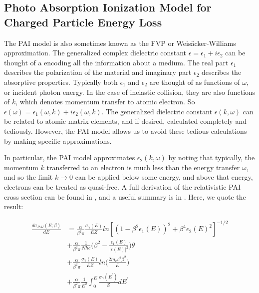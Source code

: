 \subsection{Photo Absorption Ionization Model for Charged Particle Energy Loss}
\label{sec:pai}
The \ac{PAI} model is also sometimes known as the \ac{FVP} or Weis\"{a}cker-Williams approximation. The generalized complex dielectric constant $\epsilon = \epsilon_{1} + i \epsilon_{2}$ can be thought of a encoding all the information about a medium. The real part $\epsilon_{1}$ describes the polarization of the material and imaginary part $\epsilon_{2}$ describes the absorptive properties. Typically both $\epsilon_{1}$ and $\epsilon_{2}$ are thought of as functions of $\omega$, or incident photon energy. In the case of inelastic collision, they are also functions of $k$, which denotes momentum transfer to atomic electron. So $\epsilon(\omega)  = \epsilon_{1}(\omega, k) + i \epsilon_{2}(\omega, k)$. The generalized dielectric constant $\epsilon(k, \omega)$ can be related to atomic matrix elements, and if desired, calculated completely and tediously. However, the \ac{PAI} model allows us to avoid these tedious calculations by making specific approximations.

In particular, the \ac{PAI} model approximates $\epsilon_{2}(k, \omega)$ by noting that typically, the momentum $k$ transferred to an electron is much less than the energy transfer $\omega$, and so the limit $k \rightarrow 0$ can be applied below some energy, and above that energy, electrons can be treated as quasi-free. A full derivation of the relativistic \ac{PAI} cross section can be found in \cite{AllisonCobb:1980}, and a useful summary is in \cite{Bichsel:2006}. Here, we quote the result:

\begin{equation}
\label{eq:pai}
\begin{split}
\frac{d\sigma_{PAI}(E; \beta)}{dE} &= \frac{\alpha}{\beta^{2} \pi} \frac{\sigma_{\gamma}(E)}{EZ} ln[(1-\beta^{2}\epsilon_{1}(E))^{2} + \beta^{4}\epsilon_{2}(E)^{2}]^{-1/2} \\
&+ \frac{\alpha}{\beta^{2} \pi} \frac{1}{N \hbar c} \Big ( \beta^{2} - \frac{\epsilon_{1}(E)}{ | \epsilon(E) | ^{2}} \Big ) \theta \\
&+  \frac{\alpha}{\beta^{2} \pi} \frac{\sigma_{\gamma}(E)}{EZ} ln\Big( \frac{2 m_{e}c^{2}\beta^{2}}{E} \Big) \\
&+  \frac{\alpha}{\beta^{2} \pi} \frac{1}{E^{2}} \int_{0}^{E} \frac{\sigma_{\gamma}(E^{\prime})}{Z} dE^{\prime} 
\end{split}
\end{equation}

